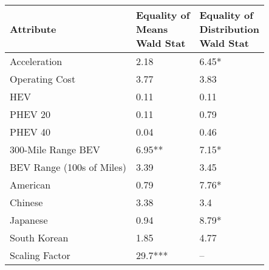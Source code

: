 \begin{tabular}{lll}
\toprule
                Attribute & \makecell{Equality of \\ Means \\ Wald Stat} & \makecell{Equality of \\ Distribution \\ Wald Stat} \\
\midrule
             Acceleration &                        \multirow{1}{*}{2.18} &                             \multirow{1}{*}{6.45*} \\
           Operating Cost &                        \multirow{1}{*}{3.77} &                              \multirow{1}{*}{3.83} \\
                      HEV &                        \multirow{1}{*}{0.11} &                              \multirow{1}{*}{0.11} \\
                  PHEV 20 &                        \multirow{1}{*}{0.11} &                              \multirow{1}{*}{0.79} \\
                  PHEV 40 &                        \multirow{1}{*}{0.04} &                              \multirow{1}{*}{0.46} \\
       300-Mile Range BEV &                      \multirow{1}{*}{6.95**} &                             \multirow{1}{*}{7.15*} \\
BEV Range (100s of Miles) &                        \multirow{1}{*}{3.39} &                              \multirow{1}{*}{3.45} \\
                 American &                        \multirow{1}{*}{0.79} &                             \multirow{1}{*}{7.76*} \\
                  Chinese &                        \multirow{1}{*}{3.38} &                               \multirow{1}{*}{3.4} \\
                 Japanese &                        \multirow{1}{*}{0.94} &                             \multirow{1}{*}{8.79*} \\
             South Korean &                        \multirow{1}{*}{1.85} &                              \multirow{1}{*}{4.77} \\
           Scaling Factor &                     \multirow{1}{*}{29.7***} &                                                 -- \\
\bottomrule
\end{tabular}
